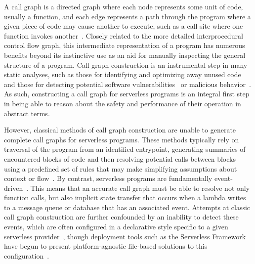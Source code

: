 \documentclass[letterpaper,twocolumn,10pt]{article}
\begin{document}
A call graph is a directed graph where each node represents some unit of code, usually a function, and each edge represents a path through the program where a given piece of code may cause another to execute, such as a call site where one function invokes another~\cite{introcallgraph}. Closely related to the more detailed interprocedural control flow graph, this intermediate representation of a program has numerous benefits beyond its instinctive use as an aid for manually inspecting the general structure of a program. Call graph construction is an instrumental step in many static analyses, such as those for identifying and optimizing away unused code~\cite{deadcode} and those for detecting potential software vulnerabilities~\cite{vulns} or malicious behavior~\cite{malicious}. As such, constructing a call graph for serverless programs is an integral first step in being able to reason about the safety and performance of their operation in abstract terms. \par

However, classical methods of call graph construction are unable to generate complete call graphs for serverless programs. These methods typically rely on traversal of the program from an identified entrypoint, generating summaries of encountered blocks of code and then resolving potential calls between blocks using a predefined set of rules that may make simplifying assumptions about context or flow~\cite{partialcallgraph}. By contrast, serverless programs are fundamentally event-driven~\cite{serverlessoverview}. This means that an accurate call graph must be able to resolve not only function calls, but also implicit state transfer that occurs when a lambda writes to a message queue or database that has an associated event. Attempts at classic call graph construction are further confounded by an inability to detect these events, which are often configured in a declarative style specific to a given serverless provider~\cite{frameworkoverview}, though deployment tools such as the Serverless Framework have begun to present platform-agnostic file-based solutions to this configuration~\cite{serverlessframework}. \par
\end{document}
